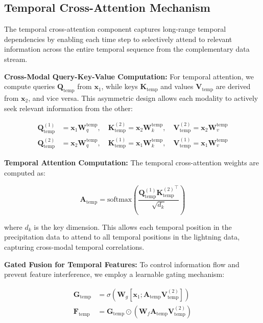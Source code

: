 \subsection{Temporal Cross-Attention Mechanism}

The temporal cross-attention component captures long-range temporal dependencies by enabling each time step to selectively attend to relevant information across the entire temporal sequence from the complementary data stream.

\textbf{Cross-Modal Query-Key-Value Computation:} For temporal attention, we compute queries $\mathbf{Q}_{\text{temp}}$ from $\mathbf{x}_1$, while keys $\mathbf{K}_{\text{temp}}$ and values $\mathbf{V}_{\text{temp}}$ are derived from $\mathbf{x}_2$, and vice versa. This asymmetric design allows each modality to actively seek relevant information from the other:

\begin{align}
\mathbf{Q}_{\text{temp}}^{(1)} &= \mathbf{x}_1 \mathbf{W}_q^{\text{temp}}, \quad \mathbf{K}_{\text{temp}}^{(2)} = \mathbf{x}_2 \mathbf{W}_k^{\text{temp}}, \quad \mathbf{V}_{\text{temp}}^{(2)} = \mathbf{x}_2 \mathbf{W}_v^{\text{temp}} \\
\mathbf{Q}_{\text{temp}}^{(2)} &= \mathbf{x}_2 \mathbf{W}_q^{\text{temp}}, \quad \mathbf{K}_{\text{temp}}^{(1)} = \mathbf{x}_1 \mathbf{W}_k^{\text{temp}}, \quad \mathbf{V}_{\text{temp}}^{(1)} = \mathbf{x}_1 \mathbf{W}_v^{\text{temp}}
\end{align}

\textbf{Temporal Attention Computation:} The temporal cross-attention weights are computed as:

\begin{equation}
\mathbf{A}_{\text{temp}} = \text{softmax}\left(\frac{\mathbf{Q}_{\text{temp}}^{(1)} {\mathbf{K}_{\text{temp}}^{(2)}}^{\top}}{\sqrt{d_k}}\right)
\end{equation}

where $d_k$ is the key dimension. This allows each temporal position in the precipitation data to attend to all temporal positions in the lightning data, capturing cross-modal temporal correlations.

\textbf{Gated Fusion for Temporal Features:} To control information flow and prevent feature interference, we employ a learnable gating mechanism:

\begin{align}
\mathbf{G}_{\text{temp}} &= \sigma\left(\mathbf{W}_g \left[\mathbf{x}_1; \mathbf{A}_{\text{temp}} \mathbf{V}_{\text{temp}}^{(2)}\right]\right) \\
\mathbf{F}_{\text{temp}} &= \mathbf{G}_{\text{temp}} \odot \left(\mathbf{W}_f \mathbf{A}_{\text{temp}} \mathbf{V}_{\text{temp}}^{(2)}\right)
\end{align}


